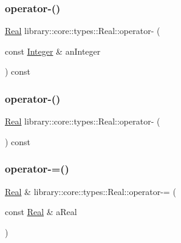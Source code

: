 \subsubsection{\texorpdfstring{operator-\/()}{operator-()}\hspace{0.1cm}{\footnotesize\ttfamily [3/4]}}
{\footnotesize\ttfamily \hyperlink{classlibrary_1_1core_1_1types_1_1_real}{Real} library\+::core\+::types\+::\+Real\+::operator-\/ (\begin{DoxyParamCaption}\item[{const \hyperlink{classlibrary_1_1core_1_1types_1_1_integer}{Integer} \&}]{an\+Integer }\end{DoxyParamCaption}) const}

\mbox{\label{classlibrary_1_1core_1_1types_1_1_real_a7a018943c5110e4023f5e462eed70a25}} 
\subsubsection{\texorpdfstring{operator-\/()}{operator-()}\hspace{0.1cm}{\footnotesize\ttfamily [4/4]}}
{\footnotesize\ttfamily \hyperlink{classlibrary_1_1core_1_1types_1_1_real}{Real} library\+::core\+::types\+::\+Real\+::operator-\/ (\begin{DoxyParamCaption}{ }\end{DoxyParamCaption}) const}

\mbox{\label{classlibrary_1_1core_1_1types_1_1_real_a91b116698504125c3e9063e5b457f3fe}} 
\subsubsection{\texorpdfstring{operator-\/=()}{operator-=()}\hspace{0.1cm}{\footnotesize\ttfamily [1/2]}}
{\footnotesize\ttfamily \hyperlink{classlibrary_1_1core_1_1types_1_1_real}{Real} \& library\+::core\+::types\+::\+Real\+::operator-\/= (\begin{DoxyParamCaption}\item[{const \hyperlink{classlibrary_1_1core_1_1types_1_1_real}{Real} \&}]{a\+Real }\end{DoxyParamCaption})}

